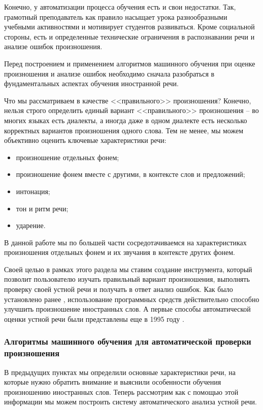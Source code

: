 Конечно, у автоматизации процесса обучения есть и свои недостатки. Так, грамотный преподаватель как правило насыщает урока разнообразными учебными активностями и мотивирует студентов развиваться. Кроме социальной стороны, есть и определенные технические ограничения в распознавании речи и анализе ошибок произношения.

Перед построением и применением алгоритмов машинного обучения при оценке произношения и анализе ошибок необходимо сначала разобраться в фундаментальных аспектах обучения иностранной речи.

Что мы рассматриваем в качестве <<правильного>> произношения? Конечно, нельзя строго определить единый вариант <<правильного>> произношения -- во многих языках есть диалекты, а иногда даже в одном диалекте есть несколько корректных вариантов произношения одного слова. Тем не менее, мы можем объективно оценить ключевые характеристики речи:
\begin{itemize}
	\item произношение отдельных фонем;
	\item произношение фонем вместе с другими, в контексте слов и предложений;
	\item интонация;
	\item тон и ритм речи;
	\item ударение.
\end{itemize}
В данной работе мы по большей части сосредотачиваемся на характеристиках произношения отдельных фонем и их звучания в контексте других фонем.

Своей целью в рамках этого раздела мы ставим создание инструмента, который позволит пользователю изучать правильный вариант произношения, выполнять проверку своей устной речи и получать в ответ анализ ошибок. Как было установлено ранее \cite{rogers1994intelligibility}, использование программных средств действительно способно улучшить произношение иностранных слов. А первые способы автоматической оценки устной речи были представлены еще в 1995 году \cite{anderson1995evaluation}.

\subsubsection{Алгоритмы машинного обучения для автоматической проверки произношения}
В предыдущих пунктах мы определили основные характеристики речи, на которые нужно обратить внимание и выяснили особенности обучения произношению иностранных слов. Теперь рассмотрим как с помощью этой информации мы можем построить систему автоматического анализа устной речи.

